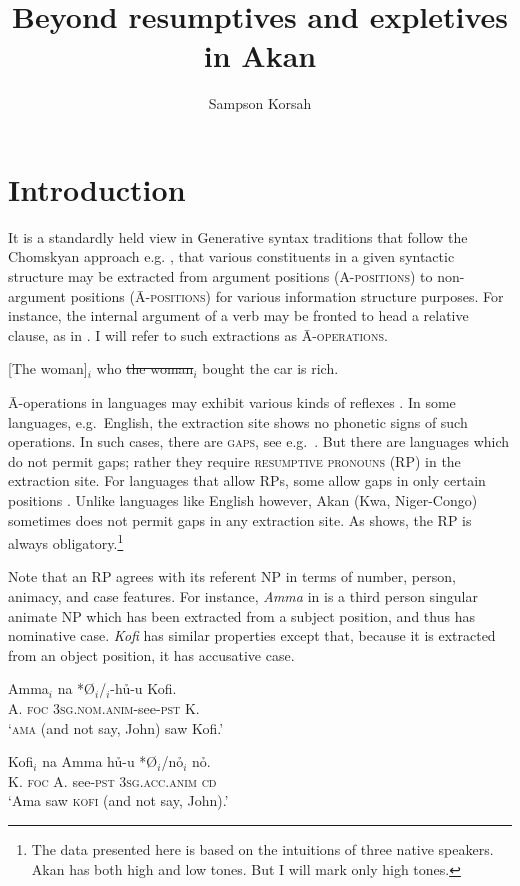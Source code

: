 \documentclass[output=paper]{LSP/langsci}
\author{Sampson Korsah \affiliation{Universit\"at Leipzig}}
\title{Beyond resumptives and expletives in {A}kan}
\begin{document}
\section{Introduction} 
It is a standardly held view in Generative syntax traditions that follow the Chomskyan approach e.g. \cite{Chomsky81}, that various constituents in a given syntactic structure may be extracted from argument positions (\textsc{A-positions}) to non-argument positions (\textsc{\=A-positions})  for various information structure purposes. For instance, the internal argument of a verb may be fronted to head a  relative clause, as in   . I will refer to such extractions as \textsc{\=A-operations}.

\ea\label{ex:korsah:1}
[The woman]$_i$ who \sout{the woman}$_i$ bought the car is rich.
\z

\=A-operations in languages may exhibit various kinds of reflexes \citep{Georgi14}. In some languages, e.g.\ English, the extraction site shows no phonetic signs of such operations. In such cases, there are \textsc{gaps}, see e.g.\ \cite{Salzmann11}.
But there are languages which do not permit gaps; rather they require \textsc{resumptive pronouns} (RP) in the extraction site. For languages that allow RPs, some allow gaps in only certain positions \citep[see][]{Klein14}.
Unlike languages like English however,  Akan (Kwa, Niger-Congo) sometimes does not permit gaps in any extraction site. As  shows, the RP is always obligatory.\footnote{The data presented here is based on the intuitions of three native speakers. Akan has both high and low tones. But I will mark only high tones.} 

Note that an RP agrees with its referent NP in terms of number, person, animacy, and case features. For instance, \textit{Amma} in  is a third person singular animate NP which has been extracted from a subject position, and thus has nominative case. \textit{Kofi}  has similar properties except that, because it is extracted from an object position, it has accusative case. 
   
\ea\label{ex:korsah:2}
\ea\label{ex:korsah:2a}
\gll Amma$_i$ na  *\O $_i$/\oor$_i$-h\h u-u Kofi. \\
A. \textsc{foc} \textsc{3sg.nom.anim-}see\textsc{-pst} K. \\
\glt  `\textsc{ama}  (and not say, John) saw Kofi.'

\ex \label{ex:korsah:2b}
\gll Kofi$_i$  na Amma h\h u-u *\O $_i$/n\h o$_i$  n\h o. \\
K. \textsc{foc} A. see\textsc{-pst} \textsc{3sg.acc.anim} \textsc{cd} \\
\glt  `Ama saw \textsc{kofi} (and not say, John).'
\z
\z   
   
\end{document}
